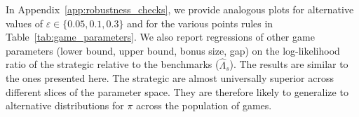In Appendix~\ref{app:robustness_checks}, we provide analogous plots for alternative values of $\varepsilon \in \{0.05, 0.1, 0.3\}$ and for the various points rules in Table~\ref{tab:game_parameters}.
We also report regressions of other game parameters (lower bound, upper bound, bonus size, gap) on the log-likelihood ratio of the strategic \aisub{} relative to the benchmarks ($\hat \Lambda_s$).
The results are similar to the ones presented here.
The strategic  are almost universally superior across different slices of the parameter space.
They are therefore likely to generalize to alternative distributions for $\pi$ across the population of games.
